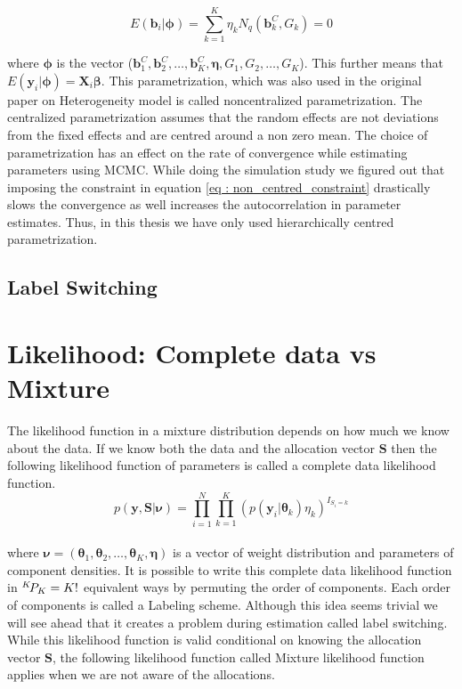 \begin{equation}
\label{eq : non_centred_constraint}
E(\boldsymbol{b}_i | \boldsymbol{\phi}) = \sum_{k=1}^{K} \eta_k N_q(\boldsymbol{b}_k^C, G_k) = 0
\end{equation}

where $\boldsymbol{\phi}$ is the vector ($\boldsymbol{b}_1^C, \boldsymbol{b}_2^C, \ldots, \boldsymbol{b}_K^C, \boldsymbol{\eta}, G_1, G_2, \ldots, G_K$). This further means that $E(\boldsymbol{y}_i | \boldsymbol{\phi}) = \boldsymbol{X}_{i}\boldsymbol{\beta}$. This parametrization, which was also used in the original paper on Heterogeneity model \citep{verbeke_linear_1996} is called noncentralized parametrization. The centralized parametrization assumes that the random effects are not deviations from the fixed effects and are centred around a non zero mean.
The choice of parametrization has an effect on the rate of convergence while estimating parameters using MCMC. While doing the simulation study we figured out that imposing the constraint in equation \ref{eq : non_centred_constraint} drastically slows the convergence as well increases the autocorrelation in parameter estimates. Thus, in this thesis we have only used hierarchically centred parametrization.

\subsection{Label Switching}

\section{Likelihood: Complete data vs Mixture}
The likelihood function in a mixture distribution depends on how much we know about the data. If we know both the data and the allocation vector $\boldsymbol{S}$ then the following likelihood function of parameters is called a complete data likelihood function.\\
$$p(\boldsymbol{y, S}|\boldsymbol{\nu}) = \prod_{i=1}^{N} \prod_{k=1}^{K} (p(\boldsymbol{y}_i | \boldsymbol{\theta}_k) \eta_k)^{I_{S_i=k}}$$\\
where $\boldsymbol{\nu} = (\boldsymbol{\theta}_1, \boldsymbol{\theta}_2, \ldots, \boldsymbol{\theta}_K, \boldsymbol{\eta})$ is a vector of weight distribution and parameters of component densities. It is possible to write this complete data likelihood function in ${}^{K}\!P_{K} = K!$ equivalent ways by permuting the order of components. Each order of components is called a Labeling scheme. Although this idea seems trivial we will see ahead that it creates a problem during estimation called label switching. While this likelihood function is valid conditional on knowing the allocation vector $\boldsymbol{S}$, the following likelihood function called Mixture likelihood function applies when we are not aware of the allocations.\\

